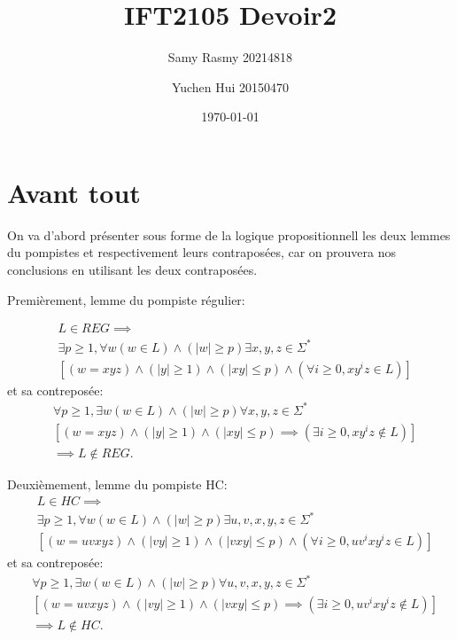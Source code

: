 \documentclass{article}
\title{\textbf{IFT2105 Devoir2}}
\author{
    Samy Rasmy 20214818 \and Yuchen Hui 20150470}
\date{\today}
\begin{document}
\maketitle
\section*{Avant tout}
On va d'abord présenter sous forme de la logique propositionnell les deux lemmes du pompistes et respectivement leurs contraposées, car on prouvera nos conclusions en utilisant les deux contraposées.
 

Premièrement, lemme du pompiste régulier:

\begin{align*}
&	L \in REG \implies \\
&	\exists p \ge 1 ,\forall w \left( w \in L \right) \wedge \left(\left| w \right| \ge p \right) \exists x,y,z \in \Sigma^{*}\\
&	\left [ \left( w=xyz \right) \wedge \left( \left| y \right| \ge 1 \right) \wedge \left(\left| xy \right| \le p\right) \wedge \left( \forall  i \ge 0, xy^{i}z \in L \right) \right] 
\end{align*}
et sa contreposée: 
\begin{align*}
&	\forall p \ge 1 ,\exists w \left( w \in L \right) \wedge \left(\left| w \right| \ge p \right) \forall x,y,z \in \Sigma^{*}\\
&\left [ \left( w=xyz \right) \wedge \left( \left| y \right| \ge 1 \right) \wedge \left(\left| xy \right| \le p\right) \implies \left( \exists  i \ge 0, xy^{i}z \not\in L \right) \right] \\
&	\implies L \not\in REG.
\end{align*}

Deuxièmement, lemme du pompiste HC:
\begin{align*}
&	L \in HC \implies \\
&	\exists p \ge 1 ,\forall w \left( w \in L \right) \wedge \left(\left| w \right| \ge p \right) \exists u,v,x,y,z \in \Sigma^{*}\\
&	\left [ \left( w=uvxyz \right) \wedge \left( \left| vy \right| \ge 1 \right) \wedge \left(\left| vxy \right| \le p\right) \wedge \left( \forall  i \ge 0, uv^{i}xy^{i}z \in L \right) \right] 
\end{align*}
et sa contreposée: 
\begin{align*}
&	\forall p \ge 1 ,\exists w \left( w \in L \right) \wedge \left(\left| w \right| \ge p \right) \forall u,v,x,y,z \in \Sigma^{*}\\
&\left [ \left( w=uvxyz \right) \wedge \left( \left| vy \right| \ge 1 \right) \wedge \left(\left| vxy \right| \le p\right) \implies \left( \exists  i \ge 0, uv^{i}xy^{i}z \not\in L \right) \right] \\
&	\implies L \not\in HC.
\end{align*}
\clearpage
\end{document}
